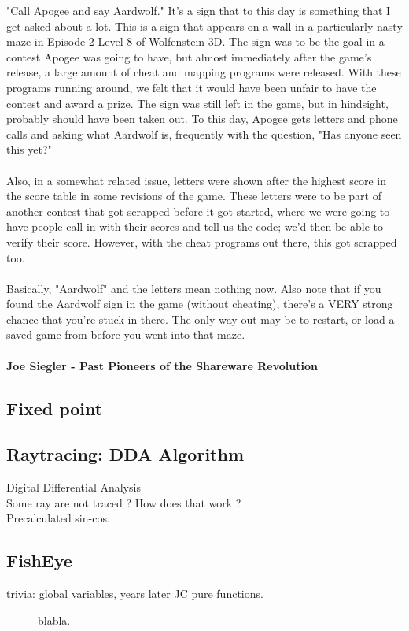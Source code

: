 \documentclass[book.tex]{subfiles}
\begin{document}
\begin{fancyquotes}
"Call Apogee and say Aardwolf."  It's a sign that to this day is something
that I get asked about a lot.  This is a sign that appears on a wall in a
particularly nasty maze in Episode 2 Level 8 of Wolfenstein 3D.  The sign
was to be the goal in a contest Apogee was going to have, but almost
immediately after the game's release, a large amount of cheat and mapping
programs were released.  With these programs running around, we felt that
it would have been unfair to have the contest and award a prize.  The sign
was still left in the game, but in hindsight, probably should have been
taken out.  To this day, Apogee gets letters and phone calls and asking
what Aardwolf is, frequently with the question, "Has anyone seen this yet?"\\
\\
Also, in a somewhat related issue, letters were shown after the highest score
in the score table in some revisions of the game.  These letters were to be
part of another contest that got scrapped before it got started, where we were
going to have people call in with their scores and tell us the code; we'd then
be able to verify their score.  However, with the cheat programs out there,
this got scrapped too.\\
\\
Basically, "Aardwolf" and the letters mean nothing now.  Also note that if
you found the Aardwolf sign in the game (without cheating), there's a VERY
strong chance that you're stuck in there.  The only way out may be to restart,
or load a saved game from before you went into that maze.\\
\\
\textbf{Joe Siegler - Past Pioneers of the Shareware Revolution}
\end{fancyquotes}

\subsection{Fixed point}
\subsection{Raytracing: DDA Algorithm}
Digital Differential Analysis\\
Some ray are not traced ? How does that work ?\\
Precalculated sin-cos.\\
\subsection{FishEye}

trivia: global variables, years later JC pure functions.
\begin{figure}[H]
\centering
 
 \caption{blabla.} \label{fig:Raycasting2}
\end{figure}
\end{document}
